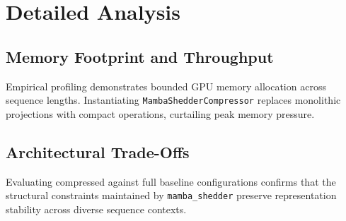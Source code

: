 \section{Detailed Analysis}

\subsection{Memory Footprint and Throughput}
Empirical profiling demonstrates bounded GPU memory allocation across sequence lengths. Instantiating \texttt{MambaShedderCompressor} replaces monolithic projections with compact operations, curtailing peak memory pressure.

\subsection{Architectural Trade-Offs}
Evaluating compressed against full baseline configurations confirms that the structural constraints maintained by \texttt{mamba_shedder} preserve representation stability across diverse sequence contexts.
